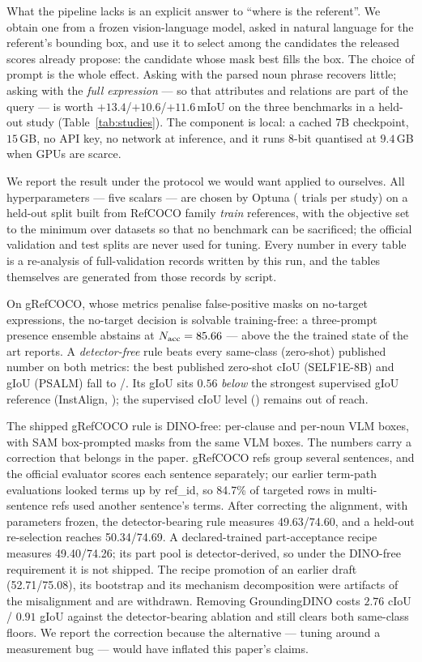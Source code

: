 What the pipeline lacks is an explicit answer to ``where is the referent''.
We obtain one from a frozen vision-language model, asked in natural language
for the referent's bounding box, and use it to select among the candidates the
released scores already propose: the candidate whose mask best fills the box.
The choice of prompt is the whole effect. Asking with the parsed noun phrase
recovers little; asking with the \emph{full expression} --- so that attributes
and relations are part of the query --- is worth
$+13.4$/$+10.6$/$+11.6$\,mIoU on the three benchmarks in a held-out study
(Table~\ref{tab:studies}). The component is local: a cached 7B checkpoint,
$15$\,GB, no API key, no network at inference, and it runs 8-bit quantised at
$9.4$\,GB when GPUs are scarce.

We report the result under the protocol we would want applied to ourselves.
All hyperparameters --- five scalars --- are chosen by Optuna
(\studyTrials{} trials per study) on a held-out split built from RefCOCO
family \emph{train} references, with the objective set to the minimum over
datasets so that no benchmark can be sacrificed; the official validation and
test splits are never used for tuning. Every number in every table is a
re-analysis of full-validation records written by this run, and the tables
themselves are generated from those records by script.

On gRefCOCO, whose metrics penalise false-positive masks on no-target
expressions, the no-target decision is solvable training-free: a three-prompt
presence ensemble abstains at $N_{\mathrm{acc}}=85.66$ --- above the
\wallTrainedNAcc{} the trained state of the art reports. A \emph{detector-free}
rule beats every same-class (zero-shot) published number on both metrics: the
best published zero-shot cIoU \grefZeroShotCIoU{} (SELF1E-8B) and gIoU
\grefZeroShotGIoU{} (PSALM) fall to \grefCIoU{}/\grefGIoU{}. Its gIoU sits
$0.56$ \emph{below} the strongest supervised gIoU reference (InstAlign,
\grefPubGIoU); the supervised cIoU level (\grefPubCIoU) remains out of reach.

The shipped gRefCOCO rule is DINO-free: per-clause and per-noun VLM boxes,
with SAM box-prompted masks from the same VLM boxes. The numbers carry a
correction that belongs in the paper. gRefCOCO refs group several sentences,
and the official evaluator scores each sentence separately; our earlier
term-path evaluations looked terms up by ref\_id, so 84.7\% of targeted rows in
multi-sentence refs used another sentence's terms. After correcting the
alignment, with parameters frozen, the detector-bearing rule measures
49.63/74.60, and a held-out re-selection reaches 50.34/74.69. A
declared-trained part-acceptance recipe measures 49.40/74.26; its part pool is
detector-derived, so under the DINO-free requirement it is not shipped. The
recipe promotion of an earlier draft (52.71/75.08), its bootstrap and its
mechanism decomposition were artifacts of the misalignment and are withdrawn.
Removing GroundingDINO costs $2.76$ cIoU / $0.91$ gIoU against the
detector-bearing ablation and still clears both same-class floors. We report
the correction because the alternative --- tuning around a measurement bug ---
would have inflated this paper's claims.

